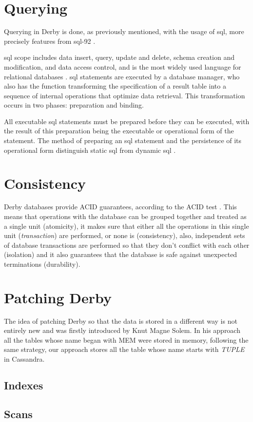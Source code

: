\section{Querying}
Querying in Derby is done, as previously mentioned, with the usage of \ac{sql}, more precisely features from \ac{sql}-92 \cite{derbySQL}.

\ac{sql} scope includes data insert, query, update and delete, schema creation and modification, and data access control, and is the most widely used language for relational databases \cite{SQLintro}. \ac{sql} statements are executed by a database manager, who also has the function transforming the specification of a result table into a sequence of internal operations that optimize data retrieval. This transformation occurs in two phases: preparation and binding.

All executable \ac{sql} statements must be prepared before they can be executed, with the result of this preparation being the executable or operational form of the statement. The method of preparing an \ac{sql} statement and the persistence of its operational form distinguish static \ac{sql} from dynamic \ac{sql} \cite{SQLibm}.

\section{Consistency}
Derby databases provide ACID guarantees, according to the ACID test \cite{derbydevIBM}. This means that operations with the database can be grouped together and treated as a single unit (atomicity), it makes sure that either all the operations in this single unit (\emph{transaction}) are performed, or none is (consistency), also, independent sets of database transactions are performed so that they don't conflict with each other (isolation) and it also guarantees that the database is safe against unexpected terminations (durability).

\section{Patching Derby}

The idea of patching Derby so that the data is stored in a different way is not entirely new and was firstly introduced by Knut Magne Solem\cite{derbyPatch}. In his approach all the tables whose name began with MEM were stored in memory, following the same strategy, our approach stores all the table whose name starts with \emph{TUPLE} in Cassandra.

\subsection{Indexes}


\missingfigure{}


\subsection{Scans}

